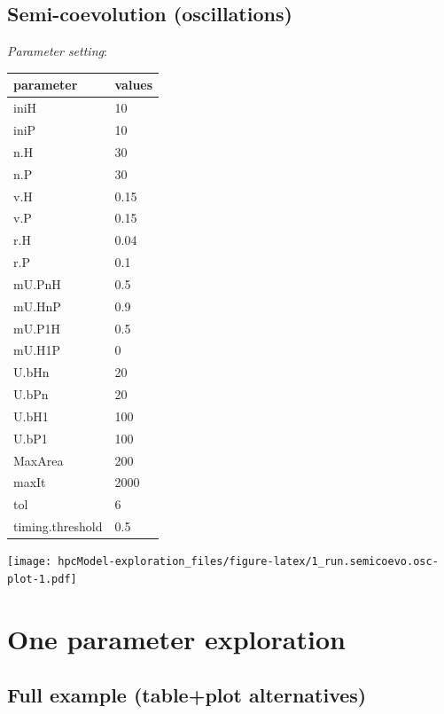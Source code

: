 \documentclass[]{book}
\begin{document}
\newpage

\hypertarget{semi-coevolution-oscillations}{%
\section{Semi-coevolution (oscillations)}\label{semi-coevolution-oscillations}}

\emph{Parameter setting}:

\begin{tabular}{l|l}
\hline
parameter & values\\
\hline
iniH & 10\\
\hline
iniP & 10\\
\hline
n.H & 30\\
\hline
n.P & 30\\
\hline
v.H & 0.15\\
\hline
v.P & 0.15\\
\hline
r.H & 0.04\\
\hline
r.P & 0.1\\
\hline
mU.PnH & 0.5\\
\hline
mU.HnP & 0.9\\
\hline
mU.P1H & 0.5\\
\hline
mU.H1P & 0\\
\hline
U.bHn & 20\\
\hline
U.bPn & 20\\
\hline
U.bH1 & 100\\
\hline
U.bP1 & 100\\
\hline
MaxArea & 200\\
\hline
maxIt & 2000\\
\hline
tol & 6\\
\hline
timing.threshold & 0.5\\
\hline
\end{tabular}

\newpage

\texttt{[image: hpcModel-exploration\_files/figure-latex/1\_run.semicoevo.osc-plot-1.pdf]}

\hypertarget{one-parameter-exploration}{%
\chapter{One parameter exploration}\label{one-parameter-exploration}}

\newpage

\hypertarget{full-example-tableplot-alternatives}{%
\section{Full example (table+plot alternatives)}\label{full-example-tableplot-alternatives}}
\end{document}
